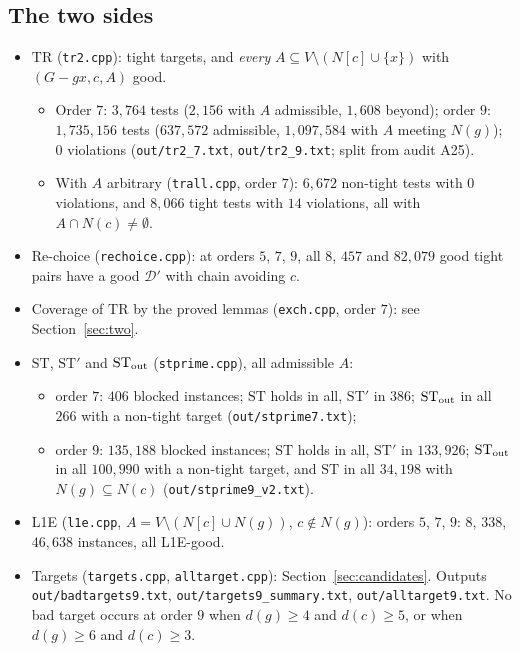 \documentclass[11pt]{amsart}
\theoremstyle{definition}
\newcommand{\cD}{\mathcal D}
\newcommand{\TR}{\mathrm{TR}}
\newcommand{\ST}{\mathrm{ST}}
\begin{document}
\subsection*{The two sides}
\begin{itemize}
\item $\TR$ (\texttt{tr2.cpp}): tight targets, and \emph{every} $A\subseteq V\setminus(N[c]\cup\{x\})$
with $(G-gx,c,A)$ good.
  \begin{itemize}
  \item Order $7$: $3{,}764$ tests ($2{,}156$ with $A$ admissible, $1{,}608$ beyond); order $9$:
  $1{,}735{,}156$ tests ($637{,}572$ admissible, $1{,}097{,}584$ with $A$ meeting $N(g)$); $0$
  violations (\texttt{out/tr2\_7.txt}, \texttt{out/tr2\_9.txt}; split from audit A25).
  \item With $A$ arbitrary (\texttt{trall.cpp}, order $7$): $6{,}672$ non-tight tests with $0$
  violations, and $8{,}066$ tight tests with $14$ violations, all with $A\cap N(c)\ne\emptyset$.
  \end{itemize}
\item Re-choice (\texttt{rechoice.cpp}): at orders $5$, $7$, $9$, all $8$, $457$ and $82{,}079$ good
tight pairs have a good $\cD'$ with chain avoiding $c$.
\item Coverage of $\TR$ by the proved lemmas (\texttt{exch.cpp}, order $7$): see
Section~\ref{sec:two}.
\item $\ST$, $\ST'$ and $\ST_{\rm out}$ (\texttt{stprime.cpp}), all admissible $A$:
  \begin{itemize}
  \item order $7$: $406$ blocked instances; $\ST$ holds in all, $\ST'$ in $386$; $\ST_{\rm out}$ in
  all $266$ with a non-tight target (\texttt{out/stprime7.txt});
  \item order $9$: $135{,}188$ blocked instances; $\ST$ holds in all, $\ST'$ in $133{,}926$;
  $\ST_{\rm out}$ in all $100{,}990$ with a non-tight target, and $\ST$ in all $34{,}198$ with
  $N(g)\subseteq N(c)$ (\texttt{out/stprime9\_v2.txt}).
  \end{itemize}
\item L1E (\texttt{l1e.cpp}, $A=V\setminus(N[c]\cup N(g))$, $c\notin N(g)$): orders $5$, $7$, $9$:
$8$, $338$, $46{,}638$ instances, all L1E-good.
\item Targets (\texttt{targets.cpp}, \texttt{alltarget.cpp}): Section~\ref{sec:candidates}. Outputs
\texttt{out/badtargets9.txt}, \texttt{out/targets9\_summary.txt}, \texttt{out/alltarget9.txt}. No bad
target occurs at order $9$ when $d(g)\ge4$ and $d(c)\ge5$, or when $d(g)\ge6$ and $d(c)\ge3$.

\end{itemize}
\end{document}
